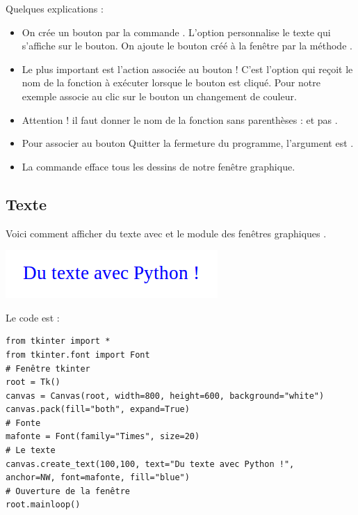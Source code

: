 \documentclass[11pt,class=report,crop=false]{standalone}
\begin{document}
Quelques explications :
\begin{itemize}
  \item On crée un bouton par la commande . L'option  personnalise le texte qui s'affiche sur le bouton. On ajoute le bouton créé à la fenêtre par la méthode .
  \item Le plus important est l'action associée au bouton ! C'est l'option  qui reçoit le nom de la fonction à exécuter lorsque le bouton est cliqué. Pour notre exemple  associe au clic sur le bouton un changement de couleur.
  
  \item Attention ! il faut donner le nom de la fonction sans parenthèses :  et pas .
  
  \item Pour associer au bouton \og{}Quitter\fg{} la fermeture du programme, l'argument est .
  
  \item La commande  efface tous les dessins de notre fenêtre graphique.
  
\end{itemize}

\subsection{Texte}

Voici comment afficher du texte avec \Python{} et le module des fenêtres graphiques .

\begin{center}
\includegraphics[scale=0.6]{../markdown/ecran-markdown-7}
\end{center}
Le code est :
\begin{lstlisting}
from tkinter import *
from tkinter.font import Font
# Fenêtre tkinter
root = Tk() 
canvas = Canvas(root, width=800, height=600, background="white")
canvas.pack(fill="both", expand=True)
# Fonte
mafonte = Font(family="Times", size=20)
# Le texte
canvas.create_text(100,100, text="Du texte avec Python !", 
anchor=NW, font=mafonte, fill="blue")
# Ouverture de la fenêtre
root.mainloop()
\end{lstlisting}
\end{document}
